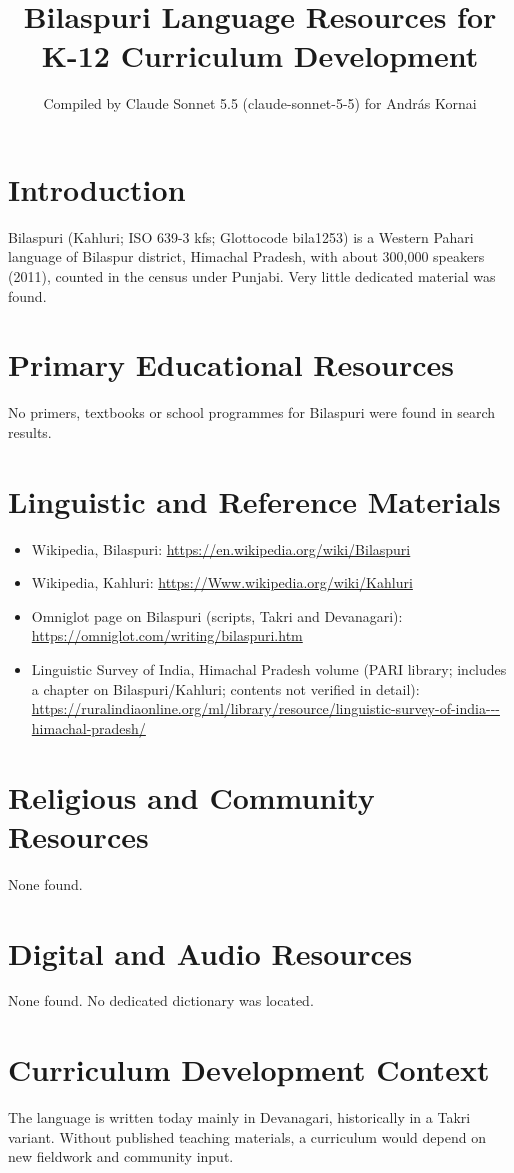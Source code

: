 \documentclass[12pt]{article}
\title{Bilaspuri Language Resources for K-12 Curriculum Development}
\author{Compiled by Claude Sonnet 5.5 (claude-sonnet-5-5) for Andr\'as Kornai}
\date{}
\begin{document}
\maketitle

\section{Introduction}
Bilaspuri (Kahluri; ISO 639-3 kfs; Glottocode bila1253) is a Western Pahari language of Bilaspur district, Himachal Pradesh, with about 300,000 speakers (2011), counted in the census under Punjabi. Very little dedicated material was found.

\section{Primary Educational Resources}
No primers, textbooks or school programmes for Bilaspuri were found in search results.

\section{Linguistic and Reference Materials}
\begin{itemize}
\item Wikipedia, Bilaspuri: \url{https://en.wikipedia.org/wiki/Bilaspuri}
\item Wikipedia, Kahluri: \url{https://Www.wikipedia.org/wiki/Kahluri}
\item Omniglot page on Bilaspuri (scripts, Takri and Devanagari): \url{https://omniglot.com/writing/bilaspuri.htm}
\item Linguistic Survey of India, Himachal Pradesh volume (PARI library; includes a chapter on Bilaspuri/Kahluri; contents not verified in detail): \url{https://ruralindiaonline.org/ml/library/resource/linguistic-survey-of-india---himachal-pradesh/}
\end{itemize}

\section{Religious and Community Resources}
None found.

\section{Digital and Audio Resources}
None found. No dedicated dictionary was located.

\section{Curriculum Development Context}
The language is written today mainly in Devanagari, historically in a Takri variant. Without published teaching materials, a curriculum would depend on new fieldwork and community input.
\end{document}

